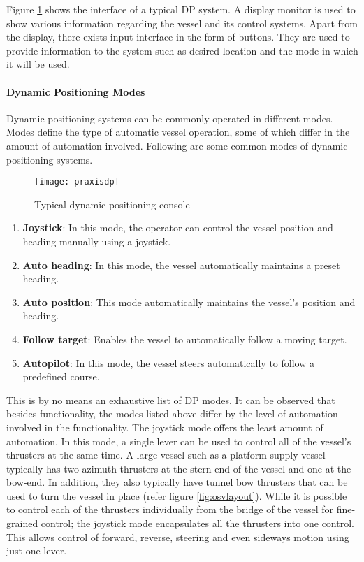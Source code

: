 
Figure \ref{fig:praxisdp} shows the interface of a typical DP system. A display monitor is used to show various information regarding the vessel and its control systems. Apart from the display, there exists input interface in the form of buttons. They are used to provide information to the system such as desired location and the mode in which it will be used. 

\paragraph{Dynamic Positioning Modes}
Dynamic positioning systems can be commonly operated in different modes. Modes define the type of automatic vessel operation, some of which differ in the amount of automation involved. Following are some common modes of dynamic positioning systems. 

\begin{figure}
	\centering
	\texttt{[image: praxisdp]}
	\caption{Typical dynamic positioning console}
	\label{fig:praxisdp}
\end{figure}

\begin{enumerate}

\item \textbf{Joystick}: In this mode, the operator can control the vessel position and heading manually using a joystick. 
\item \textbf{Auto heading}: In this mode, the vessel automatically maintains a preset heading. 
\item \textbf{Auto position}: This mode automatically maintains the vessel's position and heading. 
\item \textbf{Follow target}: Enables the vessel to automatically follow a moving target. 
\item \textbf{Autopilot}: In this mode, the vessel steers automatically to follow a predefined course. 

\end{enumerate}

This is by no means an exhaustive list of DP modes. It can be observed that besides functionality, the modes listed above differ by the level of automation involved in the functionality. The joystick mode offers the least amount of automation. In this mode, a single lever can be used to control all of the vessel's thrusters at the same time. A large vessel such as a platform supply vessel typically has two azimuth thrusters at the stern-end of the vessel and one at the bow-end. In addition, they also typically have tunnel bow thrusters that can be used to turn the vessel in place (refer figure \ref{fig:osvlayout}). While it is possible to control each of the thrusters individually from the bridge of the vessel for fine-grained control; the joystick mode encapsulates all the thrusters into one control. This allows control of forward, reverse, steering and even sideways motion using just one lever. 

